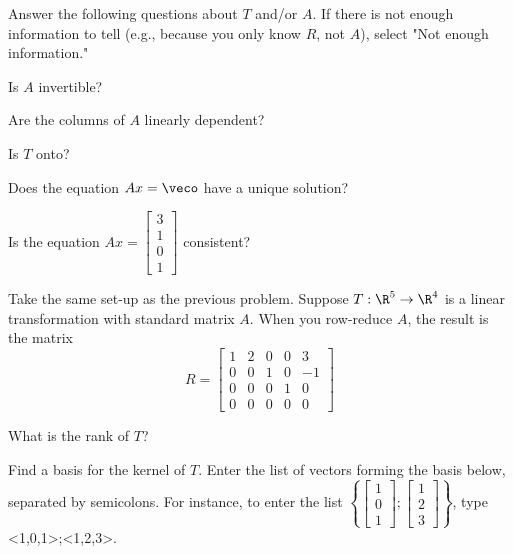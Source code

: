 Answer the following questions about $T$ and/or $A$.  If there is not enough information to tell (e.g., because you only know $R$, not $A$),
select "Not enough information."

Is $A$ invertible?  

Are the columns of $A$ linearly dependent?

Is $T$ onto?

Does the equation $Ax = \veco$ have a unique solution?

Is the equation $Ax = \left[ \begin{array}{c} 3 \\ 1 \\ 0 \\ 1 \end{array} \right]$ consistent?


\edXsolution{ 
  
}
 
\endedxproblem



\endedxvertical



Take the same set-up as the previous problem.  Suppose $T: \R^5 \rightarrow \R^4$ is a linear transformation with standard matrix $A$. When you row-reduce $A$, the result is the matrix
\[R = 
\left[ \begin{array}{ccccc}    
1 & 2 & 0 & 0 & 3 \\
0 & 0 & 1 & 0 & -1 \\
0 & 0 & 0 & 1 & 0 \\
0 & 0 & 0 & 0 & 0
\end{array}
\right]
 \]

What is the rank of $T$?  


Find a basis for the kernel of $T$.  
Enter the list of vectors forming the basis below, separated by semicolons.  For instance, 
to enter the list $\left\{\left[\begin{array}{c} 1 \\ 0 \\ 1
\end{array} \right]; \left[\begin{array}{c} 1 \\ 2 \\ 3
\end{array} \right] \right\}$, type <1,0,1>;<1,2,3>.  

